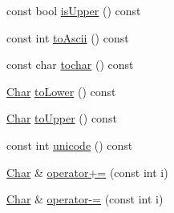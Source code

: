 \begin{DoxyCompactItemize}
\item 
const bool \hyperlink{classprism_1_1_char_a6f51555989b72ca424a515a5fb6471a9}{is\+Upper} () const 
\item 
const int \hyperlink{classprism_1_1_char_a26d719979d33ddc420591eb92fbf3bfc}{to\+Ascii} () const 
\item 
const char \hyperlink{classprism_1_1_char_aefd335b68105adc4a7904b5f6bdd6d3e}{tochar} () const 
\item 
\hyperlink{classprism_1_1_char}{Char} \hyperlink{classprism_1_1_char_af145ceb6a02081c5562871a13a865429}{to\+Lower} () const 
\item 
\hyperlink{classprism_1_1_char}{Char} \hyperlink{classprism_1_1_char_a1c34ae303e604dc91000427cea3c0934}{to\+Upper} () const 
\item 
const int \hyperlink{classprism_1_1_char_aca9ed86a1bdd3105a97cf60396b8e943}{unicode} () const 
\item 
\hyperlink{classprism_1_1_char}{Char} \& \hyperlink{classprism_1_1_char_ac55fb85b00dfabeaf52171c9cb6f09cf}{operator+=} (const int i)
\item 
\hyperlink{classprism_1_1_char}{Char} \& \hyperlink{classprism_1_1_char_a3366825c859912a25832f244eeeceb46}{operator-\/=} (const int i)
\end{DoxyCompactItemize}
